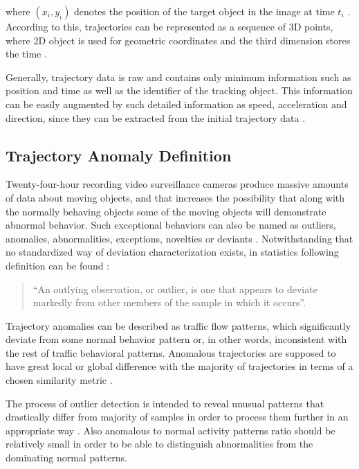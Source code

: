 where $(x_i, y_i)$ denotes the position of the target object in the image at time $t_i$ \cite{article:5_survey_tbsa}. According to this, trajectories can be represented as a sequence of 3D points, where 2D object is used for geometric coordinates and the third dimension stores the time \cite{article:25_dhr_mvt_eesd}.

Generally, trajectory data is raw and contains only minimum information such as position and time as well as the identifier of the tracking object. This information can be easily augmented by such detailed information as speed, acceleration and direction, since they can be extracted from the initial trajectory data \cite{article:12_dssto_mot}.

\subsection{Trajectory Anomaly Definition}

Twenty-four-hour recording video surveillance cameras produce massive amounts of data about moving objects, and that increases the possibility that along with the normally behaving objects some of the moving objects will demonstrate abnormal behavior. Such exceptional behaviors can also be named as outliers, anomalies, abnormalities, exceptions, novelties or deviants \cite{article:11_eod_hdd}\cite{article:15_survey_ad}. Notwithstanding that no standardized way of deviation characterization exists, in statistics following definition can be found \cite{article:13_pdoos}:

\begin{quote}
	``An outlying observation, or outlier, is one that appears to deviate markedly from other members of the sample in which it occurs''.
\end{quote}

Trajectory anomalies can be described as traffic flow patterns, which significantly deviate from some normal behavior pattern or, in other words, inconsistent with the rest of traffic behavioral patterns. Anomalous trajectories are supposed to have great local or global difference with the majority of trajectories in terms of a chosen similarity metric \cite{article:over_tod}.
 
The process of outlier detection is intended to reveal unusual patterns that drastically differ from majority of samples in order to process them further in an appropriate way \cite{article:11_eod_hdd}. Also anomalous to normal activity patterns ratio should be relatively small in order to be able to distinguish abnormalities from the dominating normal patterns.

